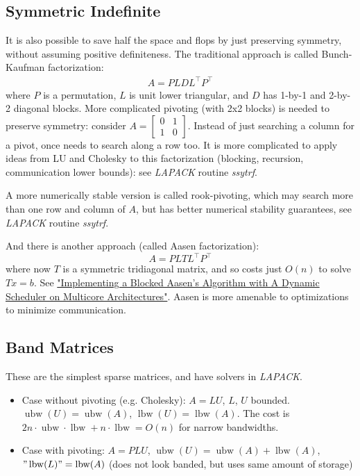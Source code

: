 \documentclass[11pt]{article}
\numberwithin{equation}{section}
\begin{document}
\subsection{Symmetric Indefinite}
It is also possible to save half the space and flops by just preserving symmetry, without assuming positive definiteness.
The traditional approach is called Bunch-Kaufman factorization:
\begin{align*}
    A = PLDL^\top P^\top
\end{align*} where $P$ is a permutation, $L$ is unit lower triangular, and $D$ has 1-by-1 and 2-by-2 diagonal blocks.
More complicated pivoting (with 2x2 blocks) is needed to preserve symmetry: consider $A=\left[\begin{array}{ll}
    0 & 1 \\
    1 & 0
    \end{array}\right]$. Instead of just searching a column for a pivot, once needs to search along a row too.
It is more complicated to apply ideas from LU and Cholesky to this factorization (blocking, recursion, communication lower bounds):
see \textit{LAPACK} routine \textit{ssytrf}.

A more numerically stable version is called rook-pivoting, which may search more than one row and column of $A$, 
but has better numerical stability guarantees, see \textit{LAPACK} routine \textit{ssytrf}.

And there is another approach (called Aasen factorization):
$$A = PLTL^\top P^\top$$ where now $T$ is a symmetric tridiagonal matrix, and so costs just $O(n)$ to solve $Tx=b$. 
See \href{https://ieeexplore.ieee.org/stamp/stamp.jsp?arnumber=6569872}{"Implementing a Blocked Aasen's Algorithm with A Dynamic Scheduler on Multicore Architectures"}. 
Aasen is more amenable to optimizations to minimize communication.

\subsection{Band Matrices}

These are the simplest sparse matrices, and have solvers in \textit{LAPACK}. 
\begin{itemize}
    \item Case without pivoting (e.g. Cholesky):
    $A=LU$, $L$, $U$ bounded. $\operatorname{ubw}(U)=\operatorname{ubw}(A)$, $\operatorname{lbw}(U)=\operatorname{lbw}(A)$.
    The cost is $2n \cdot \operatorname{ubw} \cdot \operatorname{lbw} + n \cdot \operatorname{lbw}= O(n)$ for narrow bandwidths.
    \item Case with pivoting: $A=PLU$,
    $\operatorname{ubw}(U)=\operatorname{ubw}(A) + \operatorname{lbw}(A)$, 
    $"\operatorname{lbw}(L)" = \operatorname{lbw}(A)$ (does not look banded, but uses same amount of storage)
\end{itemize}
\end{document}
